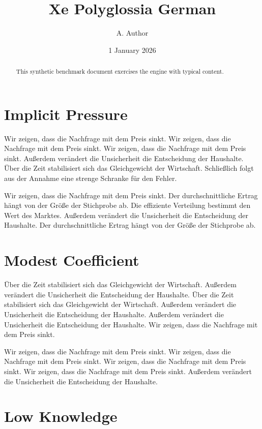 \documentclass[11pt]{article}
\title{Xe Polyglossia German}
\author{A. Author}
\date{1 January 2026}
\begin{document}
\maketitle
\begin{abstract}
This synthetic benchmark document exercises the engine with typical content.
\end{abstract}
\tableofcontents
\section{Implicit Pressure}\label{sec:1}

Wir zeigen, dass die Nachfrage mit dem Preis sinkt. Wir zeigen, dass die Nachfrage mit dem Preis sinkt. Wir zeigen, dass die Nachfrage mit dem Preis sinkt. Außerdem verändert die Unsicherheit die Entscheidung der Haushalte. Über die Zeit stabilisiert sich das Gleichgewicht der Wirtschaft. Schließlich folgt aus der Annahme eine strenge Schranke für den Fehler.

Wir zeigen, dass die Nachfrage mit dem Preis sinkt. Der durchschnittliche Ertrag hängt von der Größe der Stichprobe ab. Die effiziente Verteilung bestimmt den Wert des Marktes. Außerdem verändert die Unsicherheit die Entscheidung der Haushalte. Der durchschnittliche Ertrag hängt von der Größe der Stichprobe ab.

\section{Modest Coefficient}\label{sec:2}

Über die Zeit stabilisiert sich das Gleichgewicht der Wirtschaft. Außerdem verändert die Unsicherheit die Entscheidung der Haushalte. Über die Zeit stabilisiert sich das Gleichgewicht der Wirtschaft. Außerdem verändert die Unsicherheit die Entscheidung der Haushalte. Außerdem verändert die Unsicherheit die Entscheidung der Haushalte. Wir zeigen, dass die Nachfrage mit dem Preis sinkt.

Wir zeigen, dass die Nachfrage mit dem Preis sinkt. Wir zeigen, dass die Nachfrage mit dem Preis sinkt. Wir zeigen, dass die Nachfrage mit dem Preis sinkt. Wir zeigen, dass die Nachfrage mit dem Preis sinkt. Außerdem verändert die Unsicherheit die Entscheidung der Haushalte.

\section{Low Knowledge}\label{sec:3}
\end{document}
